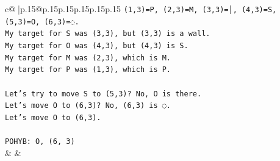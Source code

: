 \documentclass{article}
\begin{document}
{\begin{supertabular}{c@{$\;$}|p{.15\linewidth}@{}p{.15\linewidth}p{.15\linewidth}p{.15\linewidth}p{.15\linewidth}p{.15\linewidth}}
{{{\texttt{(1,3)=P, (2,3)=M, (3,3)=│, (4,3)=S, (5,3)=O, (6,3)=◌.} \\
\texttt{My target for S was (3,3), but (3,3) is a wall.} \\
\texttt{My target for O was (4,3), but (4,3) is S.} \\
\texttt{My target for M was (2,3), which is M.} \\
\texttt{My target for P was (1,3), which is P.} \\
\\ 
\texttt{Let's try to move S to (5,3)? No, O is there.} \\
\texttt{Let's move O to (6,3)? No, (6,3) is ◌.} \\
\texttt{Let's move O to (6,3).} \\
\\ 
\texttt{POHYB: O, (6, 3)} \\
            }
        }
    }
    & & \\ \\


\end{supertabular}}
\end{document}
